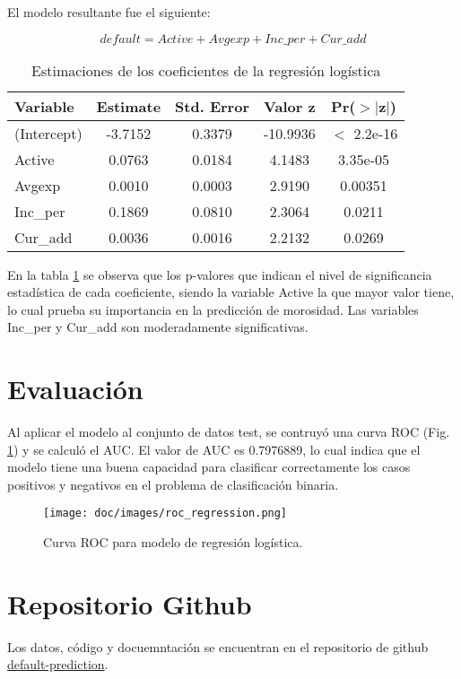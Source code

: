 \documentclass{article}
\begin{document}
El modelo resultante fue el siguiente:

\begin{equation}
    default = Active + Avgexp + Inc\_per + Cur\_add
\end{equation}


\begin{table}[htbp]
\centering
\begin{tabular}{lcccc}
\hline
Variable & Estimate & Std. Error & Valor z & Pr($>$$|$z$|$) \\
\hline
(Intercept) & -3.7152 & 0.3379 & -10.9936 & $<$ 2.2e-16 \\
Active & 0.0763 & 0.0184 & 4.1483 & 3.35e-05 \\
Avgexp & 0.0010 & 0.0003 & 2.9190 & 0.00351 \\
Inc\_per & 0.1869 & 0.0810 & 2.3064 & 0.0211 \\
Cur\_add & 0.0036 & 0.0016 & 2.2132 & 0.0269 \\
\hline
\end{tabular}
\caption{Estimaciones de los coeficientes de la regresión logística}
\label{tab:regresion-logistica}
\end{table}


En la tabla \ref{tab:regresion-logistica} se observa que los p-valores que indican el nivel de significancia estadística de cada coeficiente, siendo la variable Active la que mayor valor tiene, lo cual prueba su importancia en la predicci\'on de morosidad. Las variables Inc\_per y Cur\_add son moderadamente significativas.

\section{Evaluaci\'on}

Al aplicar el modelo al conjunto de datos test, se contruy\'o una curva ROC (Fig. \ref{fig:roc_regression}) y se calcul\'o el AUC. El valor de AUC es 0.7976889, lo cual indica que el modelo tiene una buena capacidad para clasificar correctamente los casos positivos y negativos en el problema de clasificación binaria.

\begin{figure}[htbp]
    \centering
    \texttt{[image: doc/images/roc\_regression.png]} 
    \caption{Curva ROC para modelo de regresi\'on log\'istica.}
    \label{fig:roc_regression}
\end{figure}

\section{Repositorio Github}

Los datos, c\'odigo y docuemntaci\'on se encuentran en el repositorio de github \href{https://github.com/marie0501/default-prediction}{default-prediction}.
\end{document}
